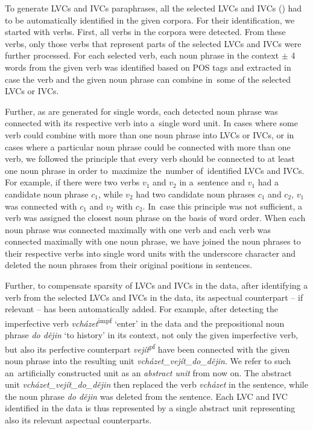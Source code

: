 \documentclass[output=paper,modfonts,nonflat]{langsci/langscibook}
\begin{document}
To generate LVCs and IVCs paraphrases, all the selected LVCs and IVCs () had to be automatically identified in the given corpora. 
For their identification, we started with verbs. First, all verbs in the 
corpora were detected. From these verbs, only those verbs that represent 
parts of the selected LVCs and IVCs were further processed. 
For each selected verb, each noun phrase in the context $\pm$ 4 words
from the given verb was identified based on POS tags and extracted 
in case the verb and the given noun phrase can combine in~some of the selected 
LVCs or IVCs.

Further, as  are generated for single words, each detected noun 
phrase was connected with its respective verb into a~single word unit. In cases where some verb could combine with more than one noun phrase into LVCs or IVCs, 
or in cases where a particular noun phrase could be connected with more than one 
verb, we followed the principle that every verb should be connected to at 
least one noun phrase  in order to~maximize the~number of~identified LVCs and 
IVCs. 
For example, if there were two verbs $v_1$ and $v_2$ in a~sentence and $v_1$ 
had a candidate noun phrase $c_1$, while $v_2$ had two candidate noun phrases 
$c_1$ and $c_2$,  $v_1$ was connected with $c_1$ and $v_2$ with $c_2$. In~case 
this principle was not sufficient, a verb was assigned the closest noun phrase 
on the basis of word order. When each noun phrase was connected maximally with 
one verb and each verb was connected maximally with one noun phrase, we have 
joined the noun phrases to their respective verbs into single word units with 
the underscore character and deleted the noun phrases from their original 
positions in sentences.

Further, to compensate sparsity of LVCs and IVCs in the data, after identifying 
a verb from the selected LVCs and IVCs in the data, its aspectual counterpart 
-- if relevant -- has been automatically added. For example, after detecting 
the imperfective verb \textit{vcházet}\textsuperscript{impf} `enter' in the data and the 
prepositional noun phrase \textit{do dějin} `to history' in its context, not 
only the given imperfective verb, but also its perfective counterpart 
\textit{vejít}\textsuperscript{pf} have been connected with the given noun phrase into the 
resulting unit \textit{vcházet\_vejít\_do\_dějin}. We refer to such 
an~artificially constructed unit as an \emph{abstract unit} from now on. The 
abstract unit \textit{vcházet\_vejít\_do\_dějin} then replaced the verb 
\textit{vcházet} in the sentence, while the noun phrase \textit{do dějin} 
was deleted from the sentence. Each LVC and IVC identified in the data is thus 
represented by a single abstract unit representing also its relevant aspectual 
counterparts. 
\end{document}
